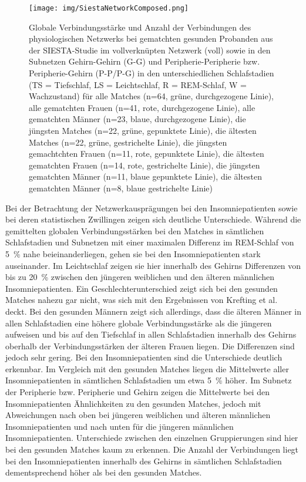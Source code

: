 \begin{figure}[H]
	\centering
	\texttt{[image: img/SiestaNetworkComposed.png]}
	\caption[Globale Verbindungsstärke und Anzahl der Verbindungen des physiologischen Netzwerks bei gematchten gesunden Probanden]{Globale Verbindungsstärke und Anzahl der Verbindungen des physiologischen Netzwerks bei gematchten gesunden Probanden aus der SIESTA-Studie im vollverknüpten Netzwerk (voll) sowie in den Subnetzen Gehirn-Gehirn (G-G) und Peripherie-Peripherie bzw. Peripherie-Gehirn (P-P/P-G) in den unterschiedlichen Schlafstadien (TS = Tiefschlaf, LS = Leichtschlaf, R = \acs{REM}-Schlaf, W = Wachzustand) für
alle Matches (n=64, grüne, durchgezogene Linie), alle gematchten Frauen (n=41, rote, durchgezogene Linie), alle gematchten Männer (n=23, blaue, durchgezogene Linie), die jüngsten Matches (n=22, grüne, gepunktete Linie), die ältesten Matches (n=22, grüne, gestrichelte Linie), die jüngsten gemachtchten Frauen (n=11, rote, gepunktete Linie), die ältesten gematchten Frauen (n=14, rote, gestrichelte Linie), die jüngsten gematchten Männer (n=11, blaue gepunktete Linie), die ältesten gematchten Männer (n=8, blaue gestrichelte Linie)}
	\label{fig:SiestaNetworkComposed}
\end{figure}

Bei der Betrachtung der Netzwerkausprägungen bei den Insomniepatienten sowie bei deren statistischen Zwillingen zeigen sich deutliche Unterschiede. Während die gemittelten globalen Verbindungsstärken bei den Matches in sämtlichen Schlafstadien und Subnetzen mit einer maximalen Differenz im \acs{REM}-Schlaf von 5~\% nahe beieinanderliegen, gehen sie bei den Insomniepatienten stark auseinander. Im Leichtschlaf zeigen sie hier innerhalb des Gehirns Differenzen von bis zu 20~\% zwischen den jüngeren weiblichen und den älteren männlichen Insomniepatienten. Ein Geschlechterunterschied zeigt sich bei den gesunden Matches nahezu gar nicht, was sich mit den Ergebnissen von Krefting et al. deckt. Bei den gesunden Männern zeigt sich allerdings, dass die älteren Männer in allen Schlafstadien eine höhere globale Verbindungsstärke als die jüngeren aufweisen und bis auf den Tiefschlaf in allen Schlafstadien innerhalb des Gehirns oberhalb der Verbindungsstärken der älteren Frauen liegen. Die Differenzen sind jedoch sehr gering. Bei den Insomniepatienten sind die Unterschiede deutlich erkennbar. Im Vergleich mit den gesunden Matches liegen die Mittelwerte aller Insomniepatienten in sämtlichen Schlafstadien um etwa 5~\% höher. Im Subnetz der Peripherie bzw. Peripherie und Gehirn zeigen die Mittelwerte bei den Insomniepatienten Ähnlichkeiten zu den gesunden Matches, jedoch mit Abweichungen nach oben bei jüngeren weiblichen und älteren männlichen Insomniepatienten und nach unten für die jüngeren männlichen Insomniepatienten. Unterschiede zwischen den einzelnen Gruppierungen sind hier bei den gesunden Matches kaum zu erkennen. Die Anzahl der Verbindungen liegt bei den Insomniepatienten innerhalb des Gehirns in sämtlichen Schlafstadien dementsprechend höher als bei den gesunden Matches. 

